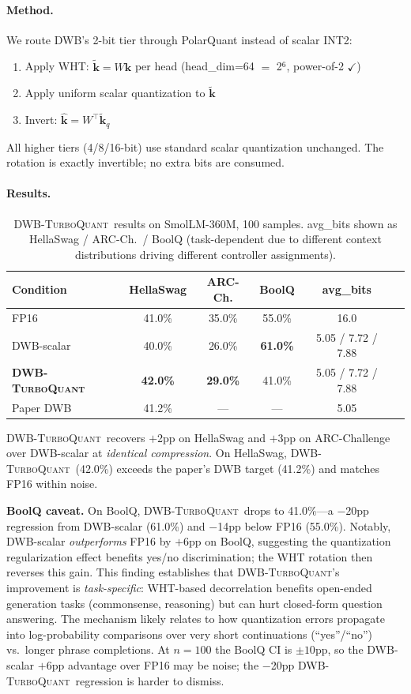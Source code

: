 \documentclass[10pt,twocolumn]{article}
\newcommand{\dwbtq}{\textsc{DWB-TurboQuant}}
\begin{document}
\paragraph{Method.}
We route DWB's 2-bit tier through PolarQuant instead of scalar INT2:
\begin{enumerate}[leftmargin=*,topsep=2pt,itemsep=0pt]
  \item Apply WHT: $\tilde{\mathbf{k}} = W \mathbf{k}$ per head
        (head\_dim=64 $=$ 2$^6$, power-of-2 $\checkmark$)
  \item Apply uniform scalar quantization to $\tilde{\mathbf{k}}$
  \item Invert: $\hat{\mathbf{k}} = W^\top \tilde{\mathbf{k}}_q$
\end{enumerate}
All higher tiers (4/8/16-bit) use standard scalar quantization
unchanged.
The rotation is exactly invertible; no extra bits are consumed.

\paragraph{Results.}

\begin{table}[h]
\centering
\caption{\dwbtq\ results on SmolLM-360M, 100 samples.
avg\_bits shown as HellaSwag / ARC-Ch.\ / BoolQ (task-dependent due to
different context distributions driving different controller assignments).}
\label{tab:tq}
\footnotesize
\begin{tabular}{lccccc}
\toprule
Condition & HellaSwag & ARC-Ch. & BoolQ & avg\_bits \\
\midrule
FP16 & 41.0\% & 35.0\% & 55.0\% & 16.0 \\
DWB-scalar & 40.0\% & 26.0\% & \textbf{61.0\%} & 5.05 / 7.72 / 7.88 \\
\textbf{\dwbtq} & \textbf{42.0\%} & \textbf{29.0\%} & 41.0\% & 5.05 / 7.72 / 7.88 \\
Paper DWB & 41.2\% & --- & --- & 5.05 \\
\bottomrule
\end{tabular}
\end{table}

\dwbtq\ recovers $+$2pp on HellaSwag and $+$3pp on ARC-Challenge
over DWB-scalar at \emph{identical compression}.
On HellaSwag, \dwbtq\ (42.0\%) exceeds the paper's DWB target (41.2\%)
and matches FP16 within noise.

\textbf{BoolQ caveat.}
On BoolQ, \dwbtq\ drops to 41.0\%---a $-$20pp regression from DWB-scalar
(61.0\%) and $-$14pp below FP16 (55.0\%).
Notably, DWB-scalar \emph{outperforms} FP16 by $+$6pp on BoolQ, suggesting
the quantization regularization effect benefits yes/no discrimination; the
WHT rotation then reverses this gain.
This finding establishes that \dwbtq's improvement is \emph{task-specific}:
WHT-based decorrelation benefits open-ended generation tasks
(commonsense, reasoning) but can hurt closed-form question answering.
The mechanism likely relates to how quantization errors propagate into
log-probability comparisons over very short continuations (``yes''/``no'')
vs.\ longer phrase completions.
At $n=100$ the BoolQ CI is $\pm 10$pp, so the DWB-scalar $+$6pp advantage
over FP16 may be noise; the $-$20pp \dwbtq\ regression is harder to dismiss.
\end{document}
